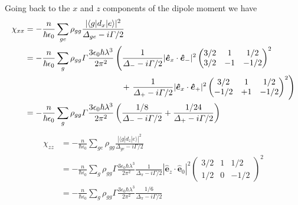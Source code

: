 \documentclass[11pt,letter]{article}
\newcommand{\bv}[1]{\ensuremath{\bm{#1}}}
\begin{document}
Going back to the $x$ and $z$ components of the dipole moment we have 
\begin{equation}
\begin{split}
   \chi_{xx}
   & = - \frac{n}{\hbar\epsilon_{0}} \sum_{ge}\rho_{gg} 
   \frac{ |\langle g | d_{x} | e \rangle|^{2} } 
       { \Delta_{ge} - i\Gamma/2 } \\
   & = - \frac{n}{\hbar\epsilon_{0}} \sum_{g} \rho_{gg} 
       \Gamma\frac{ 3\epsilon_{0} \hbar \lambda^{3}}{2 \pi^{2}} 
       \left( \frac{1}{\Delta_{-} - i \Gamma/2 } 
              |\bv{\hat{e}}_{x}\cdot \bv{\hat{e}}_{-}|^{2} 
              \begin{pmatrix} 3/2 & 1 & 1/2 \\ 3/2 & -1 & -1/2 \end{pmatrix}^{2} \right.  \\
   & \ \ \ \ \ \ \hspace{1.3in}\   +  
       \left. \frac{1}{\Delta_{+} - i \Gamma/2 } 
              |\bv{\hat{e}}_{x}\cdot \bv{\hat{e}}_{+}|^{2} 
              \begin{pmatrix} 3/2 & 1 & 1/2 \\ -1/2 & +1 & -1/2 \end{pmatrix}^{2} 
       \right) \\ 
   & = - \frac{n}{\hbar\epsilon_{0}} \sum_{g} \rho_{gg} 
       \Gamma\frac{ 3\epsilon_{0} \hbar \lambda^{3}}{2 \pi^{2}} 
       \left( \frac{1/8}{\Delta_{-} - i \Gamma/2 } 
       +  
              \frac{1/24}{\Delta_{+} - i \Gamma/2 }  
       \right)  
\end{split} 
\end{equation}
\begin{equation}
\begin{split}
   \chi_{zz}
   & = - \frac{n}{\hbar\epsilon_{0}} \sum_{ge}\rho_{gg} 
   \frac{ |\langle g | d_{z} | e \rangle|^{2} } 
       { \Delta_{ge} - i\Gamma/2 } \\
   & = - \frac{n}{\hbar\epsilon_{0}} \sum_{g} \rho_{gg} 
       \Gamma\frac{ 3\epsilon_{0} \hbar \lambda^{3}}{2 \pi^{2}} 
              \frac{1}{\Delta_{\pi} - i \Gamma/2 } 
              |\bv{\hat{e}}_{z}\cdot \bv{\hat{e}}_{0}|^{2} 
              \begin{pmatrix} 3/2 & 1 & 1/2 \\ 1/2 & 0 & -1/2 \end{pmatrix}^{2} \\
   & = - \frac{n}{\hbar\epsilon_{0}} \sum_{g} \rho_{gg} 
       \Gamma\frac{ 3\epsilon_{0} \hbar \lambda^{3}}{2 \pi^{2}} 
              \frac{1/6}{\Delta_{\pi} - i \Gamma/2 } 
\end{split} 
\end{equation}
\end{document}
